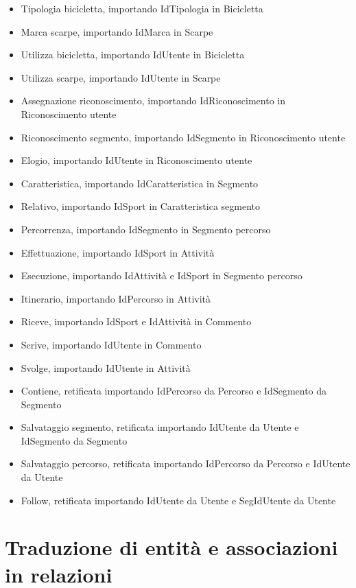 \documentclass[12pt]{report}
\begin{document}
\begin{itemize}[itemsep=0pt, parsep=0pt]
    \item Tipologia bicicletta, importando IdTipologia in Bicicletta
    \item Marca scarpe, importando IdMarca in Scarpe
    \item Utilizza bicicletta, importando IdUtente in Bicicletta
    \item Utilizza scarpe, importando IdUtente in Scarpe
    \item Assegnazione riconoscimento, importando IdRiconoscimento in Riconoscimento utente
    \item Riconoscimento segmento, importando IdSegmento in Riconoscimento utente
    \item Elogio, importando IdUtente in Riconoscimento utente
    \item Caratteristica, importando IdCaratteristica in Segmento
    \item Relativo, importando IdSport in Caratteristica segmento
    \item Percorrenza, importando IdSegmento in Segmento percorso
    \item Effettuazione, importando IdSport in Attività
    \item Esecuzione, importando IdAttività e IdSport in Segmento percorso
    \item Itinerario, importando IdPercorso in Attività
    \item Riceve, importando IdSport e IdAttività in Commento
    \item Scrive, importando IdUtente in Commento
    \item Svolge, importando IdUtente in Attività
    \item Contiene, retificata importando IdPercorso da Percorso e IdSegmento da Segmento
    \item Salvataggio segmento, retificata importando IdUtente da Utente e IdSegmento da Segmento
    \item Salvataggio percorso, retificata importando IdPercorso da Percorso e IdUtente da Utente
    \item Follow, retificata importando IdUtente da Utente e SegIdUtente da Utente
  \end{itemize}


\section{Traduzione di entità e associazioni in relazioni}
\end{document}
